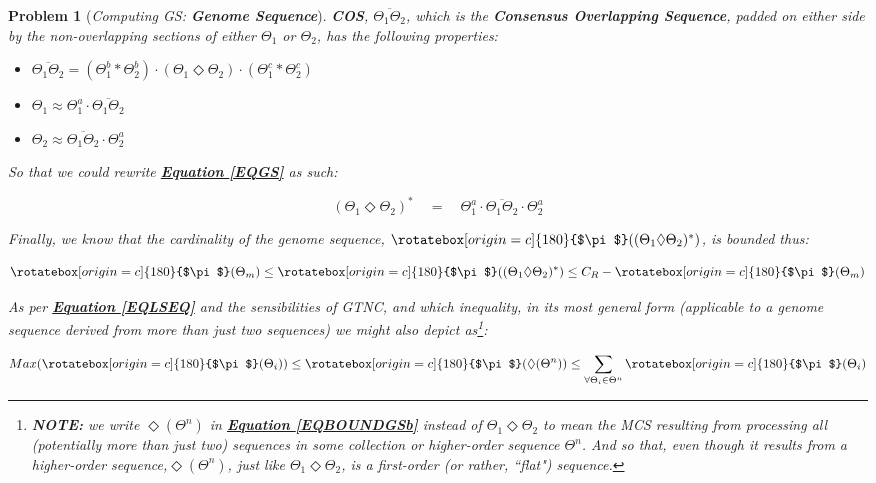 \documentclass[a4paper, 18pt]{book} %
\newtheorem{prob}{Problem}
\newcommand{\invpi}{\rotatebox[origin=c]{180}{$\pi$}}
\begin{document}
\begin{prob}[\textit{Computing GS: \textbf{Genome Sequence}}]
\textbf{COS}, $\overline{\Theta_1\Theta_2}$, which is the \textbf{Consensus Overlapping Sequence}, padded on either side by the non-overlapping sections of either $\Theta_1$ or $\Theta_2$, has the following properties:

\begin{itemize}
\item $\overline{\Theta_1\Theta_2} = (\Theta_1^b \ast \Theta_2^b)\cdot(\Theta_1 \Diamond \Theta_2)\cdot(\Theta_1^c \ast \Theta_2^c)$
\item $\Theta_1 \approx \Theta_1^a \cdot \overline{\Theta_1\Theta_2}$
\item $\Theta_2 \approx \overline{\Theta_1\Theta_2} \cdot \Theta_2^a$
\end{itemize}

So that we could rewrite \textbf{\hyperref[EQGS]{Equation \ref{EQGS}}} as such:

\vspace{1em}
\begin{equation}
\label{EQGS2}
(\Theta_1 \Diamond \Theta_2)^* \quad = \quad \Theta_1^a\cdot\overline{\Theta_1\Theta_2}\cdot\Theta_2^a
\end{equation}
\vspace{1em}

Finally, we know that the cardinality of the genome sequence, $\invpi((\Theta_1 \Diamond \Theta_2)^*)$, is bounded thus:

\vspace{1em}
\begin{equation}
\label{EQBOUNDGSa}
\invpi(\Theta_m) \leq \invpi((\Theta_1 \Diamond \Theta_2)^*) \leq C_R - \invpi(\Theta_m)
\end{equation}
\vspace{1em}

As per \textbf{\hyperref[EQLSEQ]{Equation  \ref{EQLSEQ}}} and the sensibilities of GTNC\cite{Lutalo2024gtnc}, and which inequality, in its most general form (applicable to a genome sequence derived from more than just two sequences) we might also depict as\footnote{\textbf{NOTE:} we write $\Diamond(\Theta^n)$ in  \textbf{\hyperref[EQBOUNDGSb]{Equation  \ref{EQBOUNDGSb}}} instead of $\Theta_1 \Diamond \Theta_2$ to mean the MCS resulting from processing all (potentially more than just two) sequences in some collection or higher-order sequence $\Theta^n$. And so that, even though it results from a higher-order sequence,$\Diamond(\Theta^n)$, just like $\Theta_1 \Diamond \Theta_2$, is a first-order (or rather, ``flat") sequence.}:


\vspace{1em}
\begin{equation}
\label{EQBOUNDGSb}
Max(\invpi(\Theta_i)) \leq \invpi(\Diamond(\Theta^n)) \leq \sum\limits_{\forall \Theta_i \in \Theta^n} \invpi(\Theta_i)
\end{equation}
\vspace{1em}


\end{prob}
\end{document}
